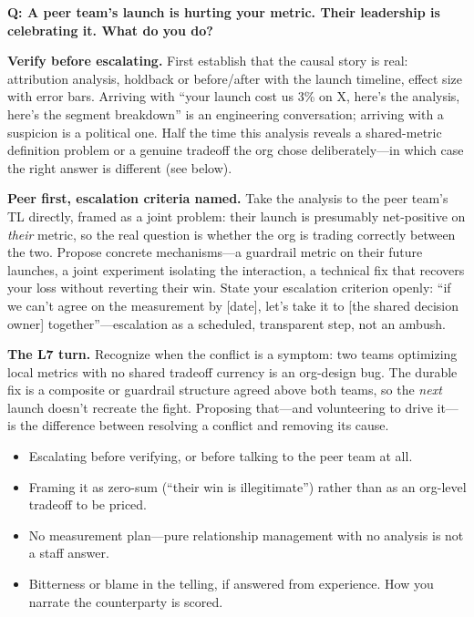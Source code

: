 \begin{interviewq}
\textbf{Q: A peer team's launch is hurting your metric. Their leadership is celebrating it. What do you do?}

 \quad {} \quad \badgefreq{\freqhigh}

\stronganswer

\textbf{Verify before escalating.} First establish that the causal story is real: attribution analysis, holdback or before/after with the launch timeline, effect size with error bars. Arriving with ``your launch cost us 3\% on X, here's the analysis, here's the segment breakdown'' is an engineering conversation; arriving with a suspicion is a political one. Half the time this analysis reveals a shared-metric definition problem or a genuine tradeoff the org chose deliberately---in which case the right answer is different (see below).

\textbf{Peer first, escalation criteria named.} Take the analysis to the peer team's TL directly, framed as a joint problem: their launch is presumably net-positive on \textit{their} metric, so the real question is whether the org is trading correctly between the two. Propose concrete mechanisms---a guardrail metric on their future launches, a joint experiment isolating the interaction, a technical fix that recovers your loss without reverting their win. State your escalation criterion openly: ``if we can't agree on the measurement by [date], let's take it to [the shared decision owner] together''---escalation as a scheduled, transparent step, not an ambush.

\textbf{The L7 turn.} Recognize when the conflict is a symptom: two teams optimizing local metrics with no shared tradeoff currency is an org-design bug. The durable fix is a composite or guardrail structure agreed above both teams, so the \textit{next} launch doesn't recreate the fight. Proposing that---and volunteering to drive it---is the difference between resolving a conflict and removing its cause.

\redflags
\begin{itemize}
    \item Escalating before verifying, or before talking to the peer team at all.
    \item Framing it as zero-sum (``their win is illegitimate'') rather than as an org-level tradeoff to be priced.
    \item No measurement plan---pure relationship management with no analysis is not a staff answer.
    \item Bitterness or blame in the telling, if answered from experience. How you narrate the counterparty is scored.
\end{itemize}


\end{interviewq}
